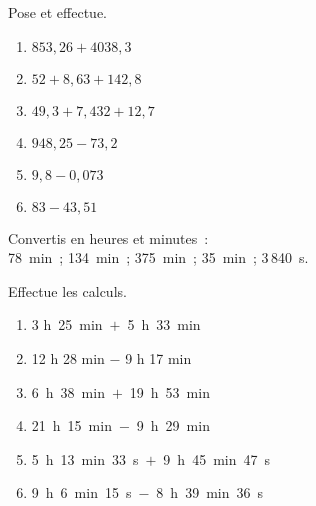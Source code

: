 \begin{exercice}
Pose et effectue.
\begin{enumerate} 
 \item $853,26 + 4 038,3$
 \item $52 + 8,63 + 142,8$
 \item $49,3 + 7,432 + 12,7$
 \item $948,25 - 73,2$
 \item $9,8 - 0,073$
 \item $83 - 43,51$
 \end{enumerate} %
\end{exercice}


\begin{exercice}
Convertis en heures et minutes :\\
78 min ; 134 min ; 375 min ; 35 min ; 3\,840 s.
\end{exercice}


\begin{exercice}
Effectue les calculs.
\begin{enumerate} 
 \item 3 h 25 min $+$ 5 h 33 min
 \item 12 h 28 min $-$ 9 h 17 min
 \item 6 h 38 min $+$ 19 h 53 min
 \item 21 h 15 min $-$ 9 h 29 min
 \item 5 h 13 min 33 s $+$ 9 h 45 min 47 s
 \item 9 h 6 min 15 s $-$ 8 h 39 min 36 s
 \end{enumerate}
\end{exercice}



